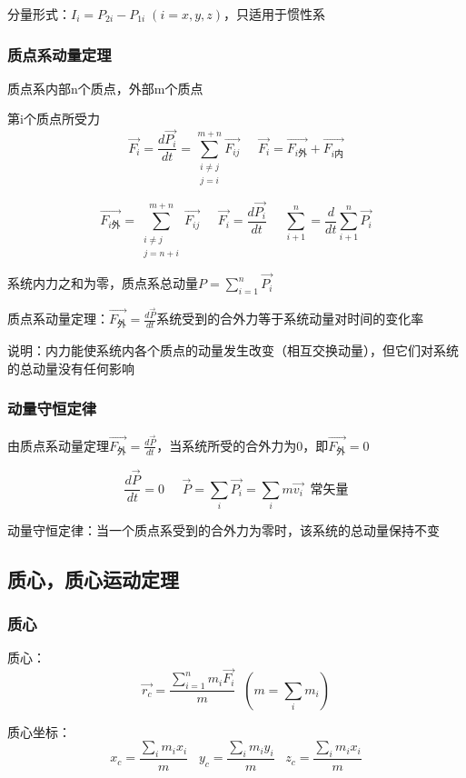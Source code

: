 \documentclass[UTF8]{article}
\begin{document}
    分量形式：$I_i = P_{2i} - P_{1i}\;(i = x, y, z)$，只适用于惯性系

\subsubsection{质点系动量定理}

    质点系内部n个质点，外部m个质点

    第i个质点所受力
    \[\vec{F_i} = \frac{d\vec{P_i}}{dt} = \sum_{\substack{i\neq j\\j=i}}^{m+n}\vec{F_{ij}}\;\;\;\;\;\vec{F_i} = \vec{F_{i\mbox{外}}}+\vec{F_{i\mbox{内}}}\]

    \[\vec{F_{i\mbox{外}}} = \sum_{\substack{i\neq j\\j=n+i}}^{m+n}\vec{F_{ij}}\;\;\;\;\;\vec{F_i} = \frac{d\vec{P_i}}{dt}\;\;\;\;\;\sum_{i+1}^n = \frac{d}{dt}\sum_{i+1}^n\vec{P_i}\]
    
    系统内力之和为零，质点系总动量\;\;$P = \sum_{i=1}^n\vec{P_i}$

    质点系动量定理：$\vec{F_{\mbox{外}}} = \frac{d\vec{P}}{dt}$\;\;\;系统受到的合外力等于系统动量对时间的变化率

    说明：内力能使系统内各个质点的动量发生改变（相互交换动量），但它们对系统的总动量没有任何影响

\subsubsection{动量守恒定律}

    由质点系动量定理\;\;\;$\vec{F_{\mbox{外}}} = \frac{d\vec{P}}{dt}$，当系统所受的合外力为0，即$\vec{F_{\mbox{外}}} = 0$

    \[\frac{d\vec{P}}{dt} = 0\;\;\;\;\;\vec{P} = \sum_i\vec{P_i} = \sum_im\vec{v_i}\;\;\mbox{常矢量}\]

    动量守恒定律：当一个质点系受到的合外力为零时，该系统的总动量保持不变

\subsection{质心，质心运动定理}

\subsubsection{质心}

    质心：\[\vec{r_c} = \frac{\sum_{i=1}^n m_i\vec{F_i}}{m}\;\;(m = \sum_i m_i)\]

    质心坐标：\[x_c = \frac{\sum_i m_i x_i}{m}\;\;\;y_c = \frac{\sum_im_iy_i}{m}\;\;\;z_c = \frac{\sum_im_ix_i}{m}\]
\end{document}
